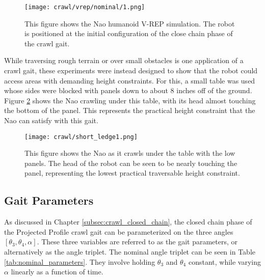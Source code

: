 \begin{figure}
  \centering
  \texttt{[image: crawl/vrep/nominal/1.png]}
  \caption{This figure shows the Nao humanoid V-REP simulation. 
           The robot is positioned at the initial configuration of the close chain phase
           of the crawl gait.}
  \label{fig:vrep_nao_nom_gait_single_frame1}
\end{figure}

While traversing rough terrain or over small obstacles is one application of a crawl gait,
these experiments were instead designed to show that the robot could access areas with
demanding height constraints. For this, a small table was used whose sides were blocked
with panels down to about 8 inches off of the ground. 
Figure \ref{fig:short_ledge_nao_nom_gait_single_frame1} shows the Nao crawling under this table,
with its head almost touching the bottom of the panel. This represents the practical height
constraint that the Nao can satisfy with this gait.

\begin{figure}
  \centering
  \texttt{[image: crawl/short\_ledge1.png]}
  \caption{This figure shows the Nao as it crawls under the table with the low panels.
           The head of the robot can be seen to be nearly touching the panel,
           representing the lowest practical traversable height constraint.}
  \label{fig:short_ledge_nao_nom_gait_single_frame1}
\end{figure}

\subsection{Gait Parameters} \label{subsec:gait_params}
As discussed in Chapter \ref{subsec:crawl_closed_chain}, the closed chain phase of the 
Projected Profile crawl gait can be parameterized on the three angles $[\theta_3, \theta_4, \alpha]$.
These three variables are referred to as the gait parameters, or alternatively as the angle triplet.
The nominal angle triplet can be seen in Table \ref{tab:nominal_parameters}. They involve holding
$\theta_3$ and $\theta_4$ constant, while varying $\alpha$ linearly as a function of time.


